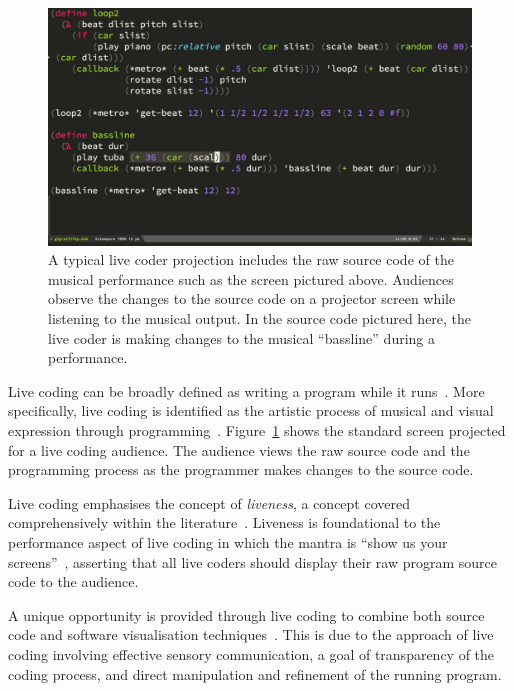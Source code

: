 \begin{figure}
\centering
\includegraphics[width=1.0\textwidth]{../images/code/live-coding-screen.png}
\caption[A typical live coder projection]{A typical live coder projection includes the raw source code of the musical performance such as the screen pictured above. Audiences observe the changes to the source code on a projector screen while listening to the musical output. In the source code pictured here, the live coder is making changes to the musical ``bassline'' during a performance.}
\label{fig:live-coding-screen}
\end{figure}

Live coding can be broadly defined as writing a program while it runs~\cite{Ward2004}. More specifically, live coding is identified as the artistic process of musical and visual expression through programming~\cite{Collins2003}. Figure~\ref{fig:live-coding-screen} shows the standard screen projected for a live coding audience. The audience views the raw source code and the programming process as the programmer makes changes to the source code.

Live coding emphasises the concept of \emph{liveness}, a concept covered comprehensively within the literature~\cite{Auslander,Masura2007}. Liveness is foundational to the performance aspect of live coding in which the mantra is ``show us your screens''~\cite{Toplap}, asserting that all live coders should display their raw program source code to the audience.

A unique opportunity is provided through live coding to combine both source code and software visualisation techniques~\cite{McLean2010a}. This is due to the approach of live coding involving effective sensory communication, a goal of transparency of the coding process, and direct manipulation and refinement of the running program.

